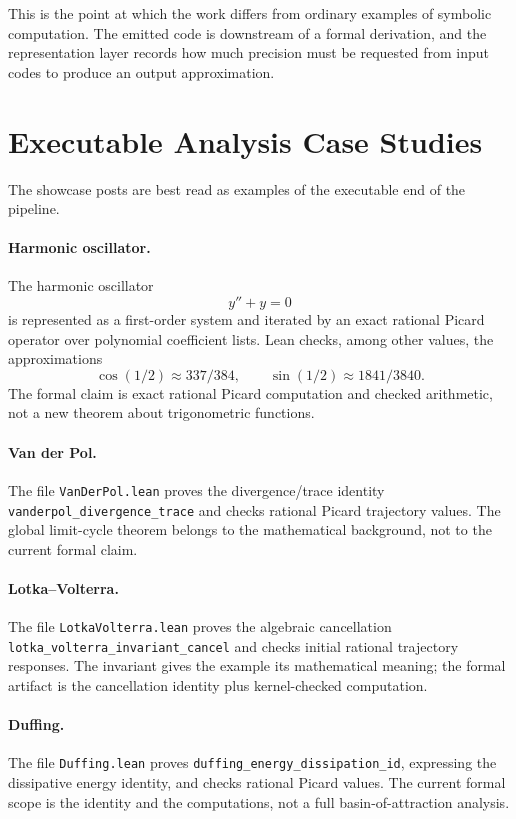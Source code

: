 \documentclass[11pt,a4paper]{article}
\theoremstyle{definition}
\theoremstyle{remark}
\newcommand{\lean}[1]{\texttt{\nolinkurl{#1}}}
\begin{document}
This is the point at which the work differs from ordinary examples of
symbolic computation.  The emitted code is downstream of a formal derivation,
and the representation layer records how much precision must be requested from
input codes to produce an output approximation.

\section{Executable Analysis Case Studies}

The showcase posts are best read as examples of the executable end of the
pipeline.

\paragraph{Harmonic oscillator.}
The harmonic oscillator
\[
  y''+y=0
\]
is represented as a first-order system and iterated by an exact rational
Picard operator over polynomial coefficient lists.  Lean checks, among other
values, the approximations
\[
  \cos(1/2) \approx 337/384,\qquad
  \sin(1/2) \approx 1841/3840 .
\]
The formal claim is exact rational Picard computation and checked arithmetic,
not a new theorem about trigonometric functions.

\paragraph{Van der Pol.}
The file \lean{VanDerPol.lean} proves the divergence/trace identity
\lean{vanderpol_divergence_trace} and checks rational Picard trajectory
values.  The global limit-cycle theorem belongs to the mathematical
background, not to the current formal claim.

\paragraph{Lotka--Volterra.}
The file \lean{LotkaVolterra.lean} proves the algebraic cancellation
\lean{lotka_volterra_invariant_cancel} and checks initial rational
trajectory responses.  The invariant gives the example its mathematical
meaning; the formal artifact is the cancellation identity plus kernel-checked
computation.

\paragraph{Duffing.}
The file \lean{Duffing.lean} proves \lean{duffing_energy_dissipation_id},
expressing the dissipative energy identity, and checks rational Picard values.
The current formal scope is the identity and the computations, not a full
basin-of-attraction analysis.
\end{document}
